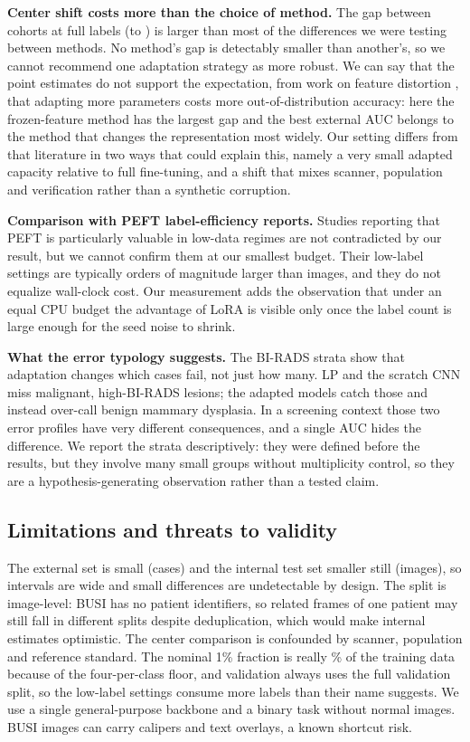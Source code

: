 \documentclass[conference,a4paper]{IEEEtran}
\begin{document}
\textbf{Center shift costs more than the choice of method.} The gap between
cohorts at full labels (\valMainLoRAHundredGapMean to \valMainLPHundredGapMean)
is larger than most of the differences we were testing between methods. No
method's gap is detectably smaller than another's, so we cannot recommend one
adaptation strategy as more robust. We can say that the point estimates do not
support the expectation, from work on feature distortion
\cite{kumar2022distortion}, that adapting more parameters costs more
out-of-distribution accuracy: here the frozen-feature method has the largest gap
and the best external AUC belongs to the method that changes the representation
most widely. Our setting differs from that literature in two ways that could
explain this, namely a very small adapted capacity relative to full fine-tuning,
and a shift that mixes scanner, population and verification rather than a
synthetic corruption.

\textbf{Comparison with PEFT label-efficiency reports.} Studies reporting that
PEFT is particularly valuable in low-data regimes
\cite{lian2024less,dutt2024missed} are not contradicted by our result, but we
cannot confirm them at our smallest budget. Their low-label settings are
typically orders of magnitude larger than \valDataSubsetOneN images, and they do
not equalize wall-clock cost. Our measurement adds the observation that under an
equal CPU budget the advantage of LoRA is visible only once the label count is
large enough for the seed noise to shrink.

\textbf{What the error typology suggests.} The BI-RADS strata show that
adaptation changes which cases fail, not just how many. LP and the scratch CNN
miss malignant, high-BI-RADS lesions; the adapted models catch those and instead
over-call benign mammary dysplasia. In a screening context those two
error profiles have very different consequences, and a single AUC hides the
difference. We report the strata descriptively: they were defined before the
results, but they involve many small groups without multiplicity control, so
they are a hypothesis-generating observation rather than a tested claim.

\subsection{Limitations and threats to validity}

The external set is small (\valDataBreastTotal cases) and the internal test set
smaller still (\valDataBusiTest images), so intervals are wide and small
differences are undetectable by design. The split is image-level: BUSI has no
patient identifiers, so related frames of one patient may still fall in
different splits despite deduplication, which would make internal estimates
optimistic. The center comparison is confounded by scanner, population and
reference standard. The nominal 1\% fraction is really
\valDataSubsetOneActualPct\% of the training data because of the four-per-class
floor, and validation always uses the full validation split, so the low-label
settings consume more labels than their name suggests. We use a single
general-purpose backbone and a binary task without normal images. BUSI images
can carry calipers and text overlays, a known shortcut risk.
\end{document}

